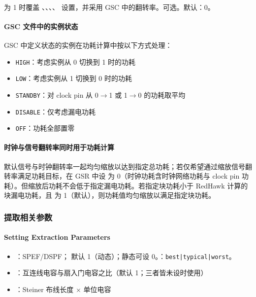 \paragraph{}
为 1 时覆盖 、、、、 设置，并采用 GSC 中的翻转率。可选。默认：0。

\paragraph{GSC 文件中的实例状态}
GSC 中定义状态的实例在功耗计算中按以下方式处理：
\begin{itemize}
  \item \texttt{HIGH}：考虑实例从 0 切换到 1 时的功耗
  \item \texttt{LOW}：考虑实例从 1 切换到 0 时的功耗
  \item \texttt{STANDBY}：对 clock pin 从 0$\rightarrow$1 或 1$\rightarrow$0 的功耗取平均
  \item \texttt{DISABLE}：仅考虑漏电功耗
  \item \texttt{OFF}：功耗全部置零
\end{itemize}

\paragraph{时钟与信号翻转率同时用于功耗计算}
默认信号与时钟翻转率一起均匀缩放以达到指定总功耗；若仅希望通过缩放信号翻转率满足功耗目标，在 GSR 中设  为 0（时钟功耗含时钟网络功耗与 clock pin 功耗）。但缩放后功耗不会低于指定漏电功耗。若指定块功耗小于 RedHawk 计算的块漏电功耗，且  为 1（默认），则功耗值均匀缩放以满足指定块功耗。

\subsubsection{提取相关参数}
\paragraph*{Setting Extraction Parameters}

\begin{itemize}
  \item {}：SPEF/DSPF； 默认 1（动态）；静态可设 0。：\texttt{best|typical|worst}。
  \item {}：互连线电容与扇入门电容之比（默认 1；三者皆未设时使用）
  \item {}：Steiner 布线长度 $\times$ 单位电容
\end{itemize}

